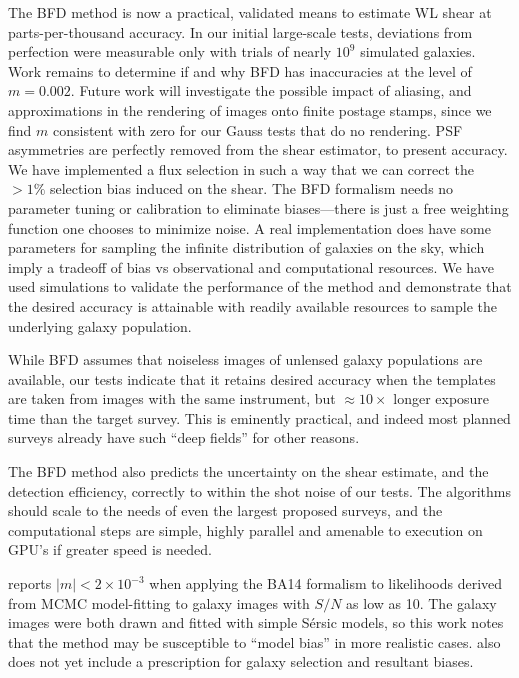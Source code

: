 \documentclass[11pt,preprint,flushrt]{aastex}
\newcommand\edit[1]{#1}
\begin{document}
The BFD method is now a practical, validated means to estimate WL shear at
parts-per-thousand accuracy.  \edit{In our initial large-scale tests, deviations from
perfection were measurable only with trials of nearly $10^9$ simulated
galaxies.  Work remains to determine if and why BFD has inaccuracies
at the level of $m=0.002.$ Future work will investigate the possible
impact of aliasing, and approximations in the rendering of images onto
finite postage stamps, since we find $m$ consistent with zero for our
Gauss tests that do no rendering.}
PSF asymmetries are perfectly removed from the shear estimator, to
present accuracy.
We have implemented a flux selection in such a way that we can
correct the $>1\%$ selection bias induced on
the shear.
The BFD formalism needs no parameter tuning or calibration to
eliminate biases---there is just a free weighting function one chooses to
minimize noise.  A real implementation does have some parameters for
sampling the infinite distribution of galaxies on the sky, which imply
a tradeoff of bias vs observational and computational resources.
We have used simulations to
validate the performance of the method and demonstrate that the
desired accuracy is attainable with readily available resources to
sample the underlying galaxy population.

While BFD assumes that noiseless images of unlensed galaxy populations
are available, our tests indicate that it retains desired accuracy
when the templates are taken from images with the same instrument, but
$\approx10\times$ longer exposure time than the target survey.  This
is eminently practical, and indeed most planned surveys already have
such ``deep fields'' for other reasons.  

The BFD method also predicts the uncertainty on the shear
estimate, and the detection efficiency, correctly to within the shot
noise of our tests.  The algorithms should scale to the needs of
even the largest proposed surveys, and the computational steps are
simple, highly parallel and amenable to execution on GPU's if greater
speed is needed.

\citet{ngmix} reports $|m|<2\times10^{-3}$ when applying the BA14
formalism to likelihoods derived from MCMC model-fitting to galaxy
images with $S/N$ as low as 10.  The galaxy images were both drawn and
fitted with simple 
S\'{e}rsic models, so this work notes that the method may be susceptible
to ``model bias'' in more realistic cases.  \cite{ngmix} also does not
yet include a prescription for galaxy selection and resultant biases.
 
\end{document}
